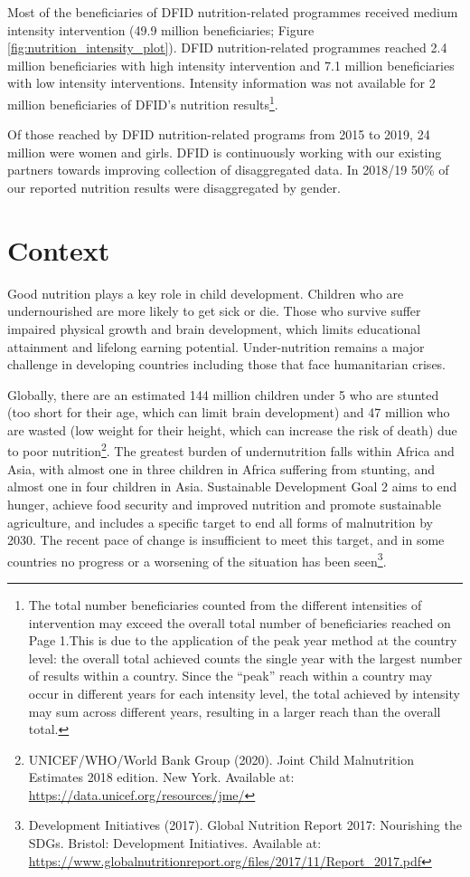 Most of the beneficiaries of DFID nutrition-related programmes received medium intensity intervention (49.9 million beneficiaries; Figure \ref{fig:nutrition_intensity_plot}). %
DFID nutrition-related programmes reached 2.4 million beneficiaries with high intensity intervention and 7.1 million beneficiaries with low intensity interventions. %
Intensity information was not available for 2 million beneficiaries of DFID's nutrition results\footnote{The total number beneficiaries counted from the different intensities of intervention may exceed the overall total number of beneficiaries reached on Page 1.This is due to the application of the peak year method at the country level: the overall total achieved counts the single year with the largest number of results within a country. Since the ``peak'' reach within a country may occur in different years for each intensity level, the total achieved by intensity may sum across different years, resulting in a larger reach than the overall total.}. %

Of those reached by DFID nutrition-related programs from 2015 to 2019, 24 million were women and girls. %
DFID is continuously working with our existing partners towards improving collection of disaggregated data. %
In 2018/19 50\% of our reported nutrition results were disaggregated by gender. %


\section{Context}

Good nutrition plays a key role in child development. Children who are undernourished are more likely to get sick or die. %
Those who survive suffer impaired physical growth and brain development, which limits educational attainment and lifelong earning potential. %
Under-nutrition remains a major challenge in developing countries including those that face humanitarian crises. %

Globally, there are an estimated 144 million children under 5 who are stunted (too short for their age, which can limit brain development) and 47 million who are wasted (low weight for their height, which can increase the risk of death) due to poor nutrition\footnote{UNICEF/WHO/World Bank Group (2020). Joint Child Malnutrition Estimates 2018 edition. New York. Available at: \href{https://data.unicef.org/resources/jme/}{https://data.unicef.org/resources/jme/}}. %
The greatest burden of undernutrition falls within Africa and Asia, with almost one in three children in Africa suffering from stunting, and almost one in four children in Asia. %
Sustainable Development Goal 2 aims to end hunger, achieve food security and improved nutrition and promote sustainable agriculture, and includes a specific target to end all forms of malnutrition by 2030. %
The recent pace of change is insufficient to meet this target, and in some countries no progress or a worsening of the situation has been seen\footnote{Development Initiatives (2017). Global Nutrition Report 2017: Nourishing the SDGs. Bristol: Development Initiatives. Available at: \href{https://www.globalnutritionreport.org/files/2017/11/Report_2017.pdf}{https://www.globalnutritionreport.org/files/2017/11/Report\_2017.pdf}}. %

